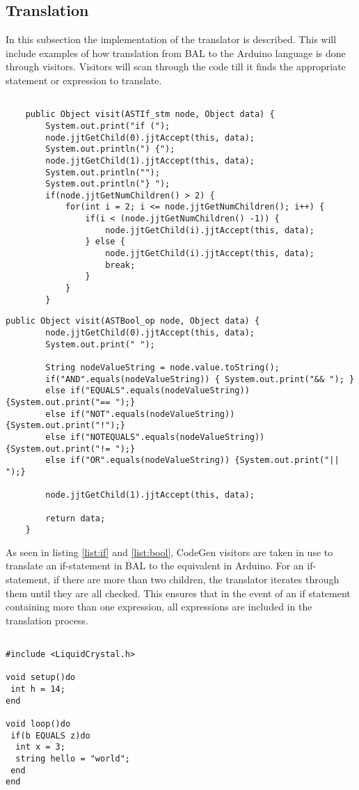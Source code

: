 \subsection{Translation}
In this subsection the implementation of the translator is described. This will include examples of how translation from BAL to the Arduino language is done through visitors.
Visitors will scan through the code till it finds the appropriate statement or expression to translate.

\begin{lstlisting}[caption=Visitor for translation of an if-statement, label=list:if]

	public Object visit(ASTIf_stm node, Object data) {
		System.out.print("if (");
		node.jjtGetChild(0).jjtAccept(this, data);
		System.out.println(") {");
		node.jjtGetChild(1).jjtAccept(this, data);
		System.out.println("");
		System.out.println("} ");
		if(node.jjtGetNumChildren() > 2) {
			for(int i = 2; i <= node.jjtGetNumChildren(); i++) {
				if(i < (node.jjtGetNumChildren() -1)) {
					node.jjtGetChild(i).jjtAccept(this, data);
				} else {
					node.jjtGetChild(i).jjtAccept(this, data);
					break;
				}
			}
		}

\end{lstlisting}

\begin{lstlisting}[caption=Visitor for translation of an boolean operators, label=list:bool]
	public Object visit(ASTBool_op node, Object data) {
		node.jjtGetChild(0).jjtAccept(this, data);
		System.out.print(" ");

		String nodeValueString = node.value.toString();
		if("AND".equals(nodeValueString)) { System.out.print("&& "); }
		else if("EQUALS".equals(nodeValueString)) {System.out.print("== ");}
		else if("NOT".equals(nodeValueString)) {System.out.print("!");}
		else if("NOTEQUALS".equals(nodeValueString)) {System.out.print("!= ");}
		else if("OR".equals(nodeValueString)) {System.out.print("|| ");}

		node.jjtGetChild(1).jjtAccept(this, data);

		return data;
	}
\end{lstlisting}

As seen in listing \ref{list:if} and  \ref{list:bool}, CodeGen visitors are taken in use to translate an if-statement in BAL to the equivalent in Arduino. For an if-statement, if there are more than two children, the translator iterates through them until they are all checked. This ensures that in the event of an if statement containing more than one expression, all expressions are included in the translation process.\\
\begin{lstlisting}[caption=Example of an if-statement written in BAL, label=list:phstmt]

#include <LiquidCrystal.h>

void setup()do
 int h = 14;
end

void loop()do
 if(b EQUALS z)do
  int x = 3;
  string hello = "world";
 end
end
\end{lstlisting}

